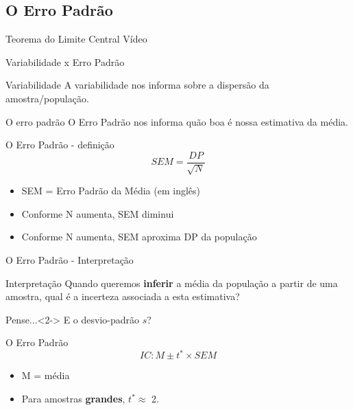 \documentclass{beamer}
\begin{document}
\subsection{O Erro Padrão}

\begin{frame}{Teorema do Limite Central}
  Vídeo
\end{frame}

\begin{frame}{ Variabilidade x Erro Padrão}
  \begin{block}{Variabilidade}
    A variabilidade nos informa sobre a dispersão da amostra/população.
  \end{block}
  \begin{block}{O erro padrão}
    O Erro Padrão nos informa quão boa é nossa \alert{estimativa} da média.
  \end{block}
\end{frame}

\begin{frame}{O Erro Padrão - definição}
  \begin{displaymath}
    SEM = \frac{DP}{\sqrt{N}}
  \end{displaymath}
  \begin{itemize}
  \item SEM = Erro Padrão da Média (em inglês)
  \item Conforme N aumenta, SEM diminui
  \item Conforme N aumenta, SEM aproxima DP da população
  \end{itemize}
\end{frame}

\begin{frame}{O Erro Padrão - Interpretação}
  \begin{block}{Interpretação}
    Quando queremos {\bf inferir} a média da população a partir de uma amostra, qual é a incerteza associada a esta estimativa?
  \end{block}
  \begin{block}{Pense...}<2->
    E o desvio-padrão $s$?
  \end{block}
\end{frame}

\begin{frame}{O Erro Padrão}
  \begin{displaymath}
    IC: M \pm t^{*} \times SEM
  \end{displaymath}
  \begin{itemize}
  \item M = média
  \item Para amostras {\bf grandes}, $t^{*} \approx$ 2.
  \end{itemize}
\end{frame}
\end{document}
